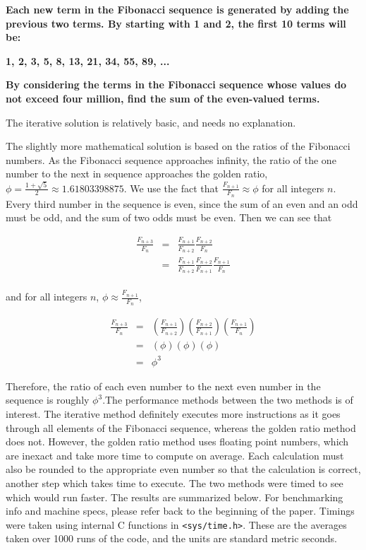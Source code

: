 \documentclass{article}
\begin{document}
\textbf{Each new term in the Fibonacci sequence is generated by adding the previous two 
terms. By starting with 1 and 2, the first 10 terms will be:}

\textbf{1, 2, 3, 5, 8, 13, 21, 34, 55, 89, ...}

\textbf{By considering the terms in the Fibonacci sequence whose values do not exceed four million, find the sum of the even-valued terms.}

\bigskip

The iterative solution is relatively basic, and needs no explanation.

The slightly more mathematical solution is based on the ratios of the Fibonacci numbers. As 
the Fibonacci sequence approaches infinity, the ratio of the one number to the next in 
sequence approaches the golden ratio, $\phi = \frac{1 + \sqrt{5}}{2} \approx 1.61803398875$. 
We use the fact that $\frac{F_{n+1}}{F_{n}} \approx \phi$ for all integers $n$.  Every third 
number in the sequence is even, since the sum of an even and an odd must be odd, and the sum 
of two odds must be even. Then we can see that

\begin{eqnarray*}
\frac{F_{n+3}}{F_{n}}	& = & \frac{F_{n+1}}{F_{n+2}}\frac{F_{n+2}}{F_{n}} \\
						& = & \frac{F_{n+1}}{F_{n+2}}\frac{F_{n+2}}{F_{n+1}}\frac{F_{n+1}}{F_{n}} \\
\end{eqnarray*}

and for all integers $n$, $\phi \approx \frac{F_{n+1}}{F_{n}}$, 

\begin{eqnarray*}
\frac{F_{n+3}}{F_{n}}	& = &\left(\frac{F_{n+1}}{F_{n+2}}\right)\left(\frac{F_{n+2}}{F_{n+1}}\right)\left(\frac{F_{n+1}}{F_{n}}\right) 	\\
						& = & (\phi)(\phi)(\phi)	\\
						& = & \phi^{3}
\end{eqnarray*}

Therefore, the ratio of each even number to the next even number in the sequence is roughly 
$\phi^{3}$.The performance methods between the two methods is of interest. The iterative 
method definitely executes more instructions as it goes through all elements of the Fibonacci 
sequence, whereas the golden ratio method does not. However, the golden ratio method uses 
floating point numbers, which are inexact and take more time to compute on average. Each 
calculation must also be rounded to the appropriate even number so that the calculation is 
correct, another step which takes time to execute. The two methods were timed to see which 
would run faster. The results are summarized below. For benchmarking info and machine specs, 
please refer back to the beginning of the paper. Timings were taken using internal C 
functions in \texttt{<sys/time.h>}. These are the averages taken over 1000 runs of the code, 
and the units are standard metric seconds. 
\end{document}
